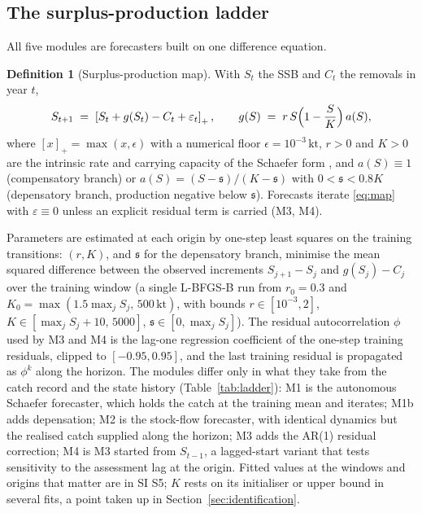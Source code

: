 \documentclass[preprint,11pt,authoryear]{elsarticle}
\theoremstyle{definition}
\newtheorem{definition}{Definition}
\theoremstyle{remark}
\newcommand{\kt}{\,\mathrm{kt}}
\newcommand{\Spos}[1]{\left[#1\right]_{+}}
\newcommand{\sA}{\mathfrak{s}}
\begin{document}
\subsection{The surplus-production ladder}\label{sec:ladder}

All five modules are forecasters built on one difference equation.

\begin{definition}[Surplus-production map]\label{def:map}
With $S_t$ the SSB and $C_t$ the removals in year $t$,
\begin{equation}\label{eq:map}
S_{t+1} \;=\; \Spos{S_t + g(S_t) - C_t + \varepsilon_t}, \qquad
g(S) \;=\; r\,S\Bigl(1-\frac{S}{K}\Bigr)\,a(S),
\end{equation}
where $[x]_+ = \max(x,\epsilon)$ with a numerical floor $\epsilon = 10^{-3}\kt$, $r>0$ and $K>0$ are the intrinsic rate and carrying capacity of the Schaefer form \citep{Schaefer1954,Pella1969}, and $a(S)\equiv 1$ (compensatory branch) or $a(S) = (S-\sA)/(K-\sA)$ with $0<\sA<0.8K$ (depensatory branch, production negative below $\sA$). Forecasts iterate \eqref{eq:map} with $\varepsilon\equiv 0$ unless an explicit residual term is carried (M3, M4).
\end{definition}

Parameters are estimated at each origin by one-step least squares on the training transitions: $(r,K)$, and $\sA$ for the depensatory branch, minimise the mean squared difference between the observed increments $S_{j+1}-S_j$ and $g(S_j)-C_j$ over the training window (a single L-BFGS-B run from $r_0=0.3$ and $K_0=\max(1.5\max_j S_j,\,500\kt)$, with bounds $r\in[10^{-3},2]$, $K\in[\max_j S_j+10,\,5000]$, $\sA\in[0,\max_j S_j]$). The residual autocorrelation $\phi$ used by M3 and M4 is the lag-one regression coefficient of the one-step training residuals, clipped to $[-0.95,0.95]$, and the last training residual is propagated as $\phi^k$ along the horizon. The modules differ only in what they take from the catch record and the state history (Table~\ref{tab:ladder}): M1 is the autonomous Schaefer forecaster, which holds the catch at the training mean and iterates; M1b adds depensation; M2 is the stock-flow forecaster, with identical dynamics but the realised catch supplied along the horizon; M3 adds the AR(1) residual correction; M4 is M3 started from $S_{t-1}$, a lagged-start variant that tests sensitivity to the assessment lag at the origin. Fitted values at the windows and origins that matter are in SI S5; $K$ rests on its initialiser or upper bound in several fits, a point taken up in Section~\ref{sec:identification}.
\end{document}
